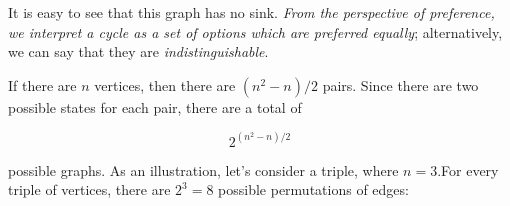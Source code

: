\documentclass[12pt]{book}
\begin{document}
\begin{center}
\end{center}

It is easy to see that this graph has no sink.
\textit{From the perspective of preference, we interpret a cycle as a set of options which are preferred equally}; alternatively, we can say that they are \textit{indistinguishable}.

If there are $n$ vertices, then there are $(n^2-n)/2$ pairs.
Since there are two possible states for each pair, there are a total of

\[
2^{(n^2-n)/2}
\]

possible graphs.
As an illustration, let's consider a triple, where $n = 3$.For every triple of vertices, there are $2^3 = 8$ possible permutations of edges:
\end{document}
